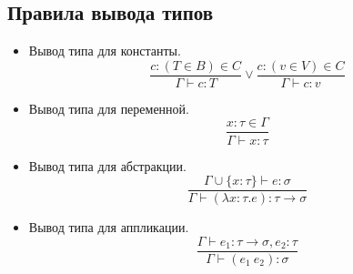 \subsection*{Правила вывода типов}
\begin{itemize}
  \item Вывод типа для константы.
        \begin{equation}\frac{c:(T \in B) \in C}{\Gamma \vdash c: T} \vee \frac{c:(v \in V) \in C}{\Gamma \vdash c: v}\end{equation}
  \item Вывод типа для переменной.
        \begin{equation}\frac{x: \tau \in \Gamma}{\Gamma \vdash x: \tau}\label{eq:2}\end{equation}
  \item Вывод типа для абстракции.
        \begin{equation}\frac{\Gamma \cup\{x: \tau\} \vdash e: \sigma}{\Gamma \vdash(\lambda x: \tau . e): \tau \rightarrow \sigma}\label{eq:3}\end{equation}
  \item Вывод типа для аппликации.
        \begin{equation}\frac{\Gamma \vdash e_{1}: \tau \rightarrow \sigma, e_{2}: \tau}{\Gamma \vdash\left(e_{1}\ e_{2}\right): \sigma}\label{eq:4}\end{equation}
\end{itemize}
